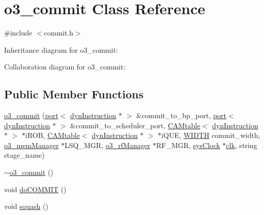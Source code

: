 \hypertarget{classo3__commit}{
\section{o3\_\-commit Class Reference}
\label{classo3__commit}
}


{\ttfamily \#include $<$commit.h$>$}



Inheritance diagram for o3\_\-commit:


Collaboration diagram for o3\_\-commit:
\subsection*{Public Member Functions}
\begin{DoxyCompactItemize}
\item 
\hyperlink{classo3__commit_a91a1d19160a540ed0cd90012ef794de6}{o3\_\-commit} (\hyperlink{classport}{port}$<$ \hyperlink{classdynInstruction}{dynInstruction} $\ast$ $>$ \&commit\_\-to\_\-bp\_\-port, \hyperlink{classport}{port}$<$ \hyperlink{classdynInstruction}{dynInstruction} $\ast$ $>$ \&commit\_\-to\_\-scheduler\_\-port, \hyperlink{classCAMtable}{CAMtable}$<$ \hyperlink{classdynInstruction}{dynInstruction} $\ast$ $>$ $\ast$iROB, \hyperlink{classCAMtable}{CAMtable}$<$ \hyperlink{classdynInstruction}{dynInstruction} $\ast$ $>$ $\ast$iQUE, \hyperlink{global_2global_8h_a6fa2e24b8a418fa215e183264cbea3aa}{WIDTH} commit\_\-width, \hyperlink{classo3__memManager}{o3\_\-memManager} $\ast$LSQ\_\-MGR, \hyperlink{classo3__rfManager}{o3\_\-rfManager} $\ast$RF\_\-MGR, \hyperlink{classsysClock}{sysClock} $\ast$\hyperlink{g__objs_8h_afc4784c140eed1743728e83840e91c12}{clk}, string stage\_\-name)
\item 
\hyperlink{classo3__commit_a9ececc230499566621371fab58aae228}{$\sim$o3\_\-commit} ()
\item 
void \hyperlink{classo3__commit_a67e4863baa5bf380c7f3d81418ae2729}{doCOMMIT} ()
\item 
void \hyperlink{classo3__commit_a5f2bb89740e401fd718aa37d5deb63b9}{squash} ()
\end{DoxyCompactItemize}


